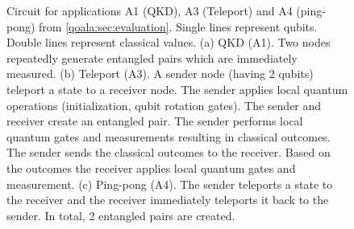 \begin{figure}[t]
    \centering

    \vspace{1cm}
    \vspace{1cm}
    \caption{
    Circuit for applications A1 (QKD), A3 (Teleport) and A4 (ping-pong) from \cref{qoala:sec:evaluation}.
    Single lines represent qubits. Double lines represent classical values.
    (a) QKD (A1). Two nodes repeatedly generate entangled pairs which are immediately measured.
    (b) Teleport (A3). A sender node (having 2 qubits) teleport a state to a receiver node. The sender applies local quantum operations (initialization, qubit rotation gates).
    The sender and receiver create an entangled pair. The sender performs local quantum gates and measurements resulting in classical outcomes.
    The sender sends the classical outcomes to the receiver. Based on the outcomes the receiver applies local quantum gates and measurement.
    (c) Ping-pong (A4). The sender teleports a state to the receiver and the receiver immediately teleports it back to the sender. In total, 2 entangled pairs are created.
    }
    \label{qoala:fig:app:circuits_1}
\end{figure}

